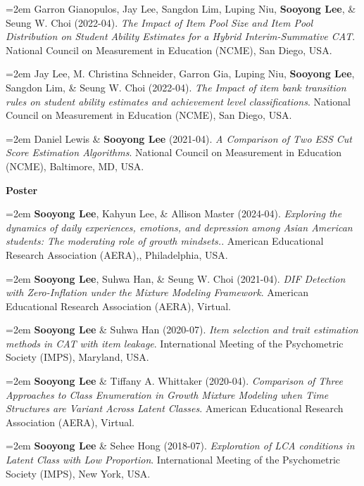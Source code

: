 \documentclass[11pt,letterpaper,]{awesome-me}
\begin{document}
\hangindent=2em  Garron Gianopulos, Jay Lee, Sangdon Lim,
Luping Niu, \textbf{Sooyong Lee}, \& Seung W. Choi (2022-04). \emph{The
Impact of Item Pool Size and Item Pool Distribution on Student Ability
Estimates for a Hybrid Interim-Summative CAT}. National Council on
Measurement in Education (NCME), San Diego, USA.

\hangindent=2em  Jay Lee, M. Christina Schneider, Garron
Gia, Luping Niu, \textbf{Sooyong Lee}, Sangdon Lim, \& Seung W. Choi
(2022-04). \emph{The Impact of item bank transition rules on student
ability estimates and achievement level classifications}. National
Council on Measurement in Education (NCME), San Diego, USA.

\hangindent=2em  Daniel Lewis \& \textbf{Sooyong Lee}
(2021-04). \emph{A Comparison of Two ESS Cut Score Estimation
Algorithms}. National Council on Measurement in Education (NCME),
Baltimore, MD, USA.

\setlength{\leftskip}{0cm}

\textbf{Poster}

\setlength{\leftskip}{0.5cm}

\hangindent=2em  \textbf{Sooyong Lee}, Kahyun Lee, \&
Allison Master (2024-04). \emph{Exploring the dynamics of daily
experiences, emotions, and depression among Asian American students: The
moderating role of growth mindsets.}. American Educational Research
Association (AERA),, Philadelphia, USA.

\hangindent=2em  \textbf{Sooyong Lee}, Suhwa Han, \& Seung
W. Choi (2021-04). \emph{DIF Detection with Zero-Inflation under the
Mixture Modeling Framework}. American Educational Research Association
(AERA), Virtual.

\hangindent=2em  \textbf{Sooyong Lee} \& Suhwa Han
(2020-07). \emph{Item selection and trait estimation methods in CAT with
item leakage}. International Meeting of the Psychometric Society (IMPS),
Maryland, USA.

\hangindent=2em  \textbf{Sooyong Lee} \& Tiffany A.
Whittaker (2020-04). \emph{Comparison of Three Approaches to Class
Enumeration in Growth Mixture Modeling when Time Structures are Variant
Across Latent Classes}. American Educational Research Association
(AERA), Virtual.

\hangindent=2em  \textbf{Sooyong Lee} \& Sehee Hong
(2018-07). \emph{Exploration of LCA conditions in Latent Class with Low
Proportion}. International Meeting of the Psychometric Society (IMPS),
New York, USA.
\end{document}
